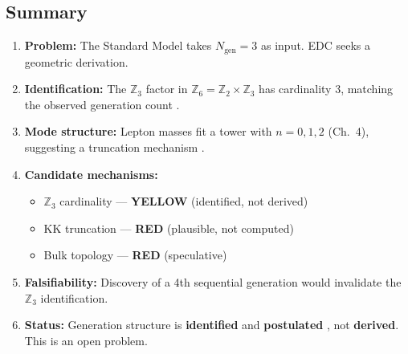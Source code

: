 \subsection{Summary}
\label{sec:ch5_summary}

\begin{enumerate}
    \item \textbf{Problem:} The Standard Model takes $N_{\text{gen}} = 3$ as input.
          EDC seeks a geometric derivation.

    \item \textbf{Identification:} The $\mathbb{Z}_3$ factor in
          $\mathbb{Z}_6 = \mathbb{Z}_2 \times \mathbb{Z}_3$ has cardinality 3,
          matching the observed generation count \tagI{}.

    \item \textbf{Mode structure:} Lepton masses fit a tower with $n = 0, 1, 2$
          (Ch.~4), suggesting a truncation mechanism \tagI{}.

    \item \textbf{Candidate mechanisms:}
          \begin{itemize}[nosep]
              \item[(A)] $\mathbb{Z}_3$ cardinality — \textcolor{orange!80!black}{\textbf{YELLOW}} (identified, not derived)
              \item[(B)] KK truncation — \textcolor{red!80!black}{\textbf{RED}} (plausible, not computed)
              \item[(C)] Bulk topology — \textcolor{red!80!black}{\textbf{RED}} (speculative)
          \end{itemize}

    \item \textbf{Falsifiability:} Discovery of a 4th sequential generation would
          invalidate the $\mathbb{Z}_3$ identification.

    \item \textbf{Status:} Generation structure is \textbf{identified} \tagI{} and
          \textbf{postulated} \tagP{}, not \textbf{derived}. This is an open problem.
\end{enumerate}

